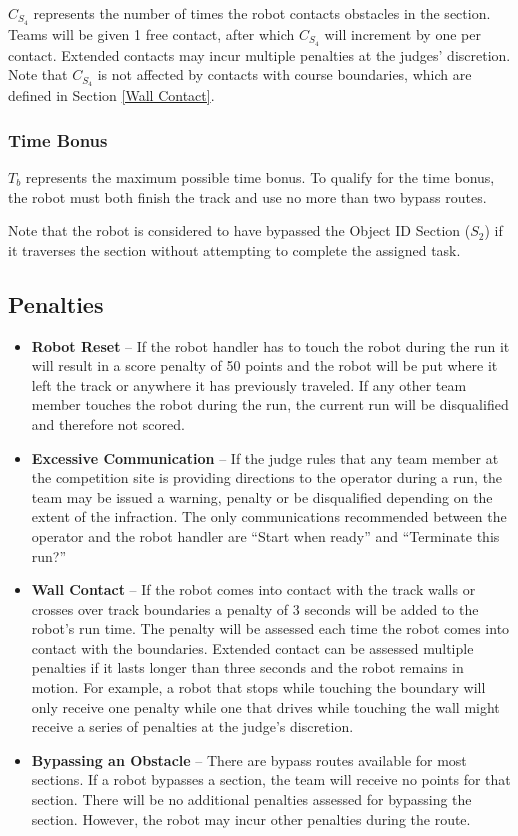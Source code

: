 $C_{S_4}$ represents the number of times the robot contacts obstacles in the section. Teams will be given 1 free contact, after which $C_{S_4}$ will increment by one per contact. Extended contacts may incur multiple penalties at the judges' discretion. Note that $C_{S_4}$ is not affected by contacts with course boundaries, which are defined in Section \ref{Wall Contact}.


\subsubsection{Time Bonus}
$T_b$ represents the maximum possible time bonus. To qualify for the time bonus, the robot must both finish the track and use no more than two bypass routes.

Note that the robot is considered to have bypassed the Object ID Section ($S_2$) if it traverses the section without attempting to complete the assigned task.

\subsection{Penalties}
\begin{itemize}
\item \textbf{Robot Reset} – If the robot handler has to touch the robot during the run it will result in a score penalty of 50 points and the robot will be put where it left the track or anywhere it has previously traveled. If any other team member touches the robot during the run, the current run will be disqualified and therefore not scored.
\item \textbf{Excessive Communication} – If the judge rules that any team member at the competition site is providing directions to the operator during a run, the team may be issued a warning, penalty or be disqualified depending on the extent of the infraction. The only communications recommended between the operator and the robot handler are “Start when ready” and “Terminate this run?” 
\item  \textbf{Wall Contact}\label{Wall Contact} – If the robot comes into contact with the track walls or crosses over track boundaries a penalty of 3 seconds will be added to the robot's run time. The penalty will be assessed each time the robot comes into contact with the boundaries. Extended contact can be assessed multiple penalties if it lasts longer than three seconds and the robot remains in motion. For example, a robot that stops while touching the boundary will only receive one penalty while one that drives while touching the wall might receive a series of penalties at the judge’s discretion.
\item \textbf{Bypassing an Obstacle}\label{bypass} -- There are bypass routes available for most sections. If a robot bypasses a section, the team will receive no points for that section. There will be no additional penalties assessed for bypassing the section. However, the robot may incur other penalties during the route.  
\end{itemize}

